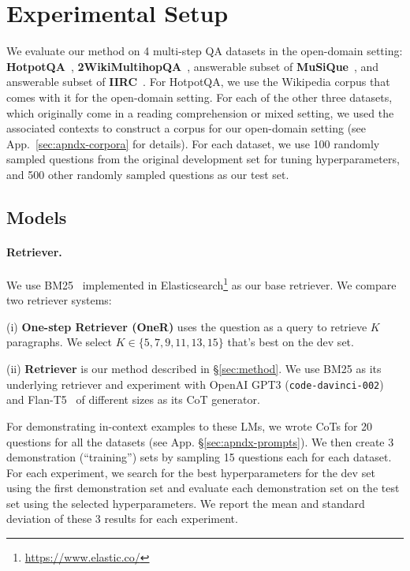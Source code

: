 
\section{Experimental Setup}
\label{sec:exp-setup}

We evaluate our method on 4 multi-step QA datasets in the open-domain setting: \textbf{HotpotQA}~\cite{hotpotqa}, \textbf{2WikiMultihopQA}~\cite{xanh2020_2wikimultihop}, answerable subset of \textbf{MuSiQue}~\cite{musique}, and answerable subset of \textbf{IIRC}~\cite{iirc}. For HotpotQA, we use the Wikipedia corpus that comes with it for the open-domain setting. For each of the other three datasets, which originally come in a reading comprehension or mixed setting, we used the associated contexts to construct a corpus for our open-domain setting (see App.~\ref{sec:apndx-corpora} for details). For each dataset, we use 100 randomly sampled questions from the original development set for tuning hyperparameters, and 500 other randomly sampled questions as our test set.


\subsection{Models}
\label{subsec:exp-models}

\paragraph{Retriever.} We use BM25~\cite{bm25} implemented in Elasticsearch\footnote{\url{https://www.elastic.co/}} as our base retriever. We compare two retriever systems:

(i) \textbf{One-step Retriever (OneR)} uses the question as a query to retrieve $K$ paragraphs. We select $K \in \{5, 7, 9, 11, 13, 15\}$ that's best on the dev set.

(ii) \textbf{\iconsys Retriever} is our method described in \S\ref{sec:method}. We use BM25 as its underlying retriever and experiment with OpenAI GPT3 (\texttt{code-davinci-002})~\cite{originalgpt3,instructgpt3,codex} and Flan-T5~\cite{flan} of different sizes as its CoT generator.

For demonstrating in-context examples to these LMs, we wrote CoTs for 20 questions for all the datasets (see App. \S\ref{sec:apndx-prompts}). We then create 3 demonstration (``training'') sets by sampling 15 questions each for each dataset. For each experiment, we search for the best hyperparameters for the dev set using the first demonstration set and evaluate each demonstration set on the test set using the selected hyperparameters. We report the mean and standard deviation of these 3 results for each experiment.

